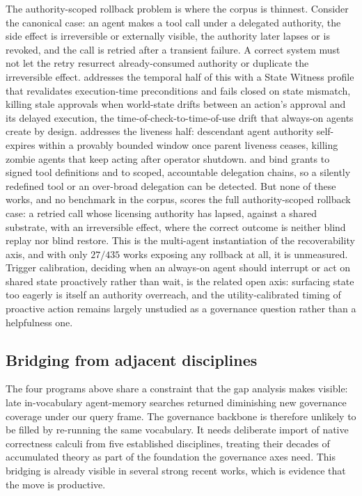 The authority-scoped rollback problem is where the corpus is thinnest. Consider the
canonical case: an agent makes a tool call under
a delegated authority, the side effect is irreversible or externally visible, the
authority later lapses or is revoked, and the call is retried after a transient
failure. A correct system must not let the retry resurrect already-consumed authority
or duplicate the irreversible effect. \citet{zhu2026openport} addresses the temporal
half of this with a State Witness profile that revalidates execution-time
preconditions and fails closed on state mismatch, killing stale approvals when
world-state drifts between an action's approval and its delayed execution, the
time-of-check-to-time-of-use drift that always-on agents create by design.
\citet{deochake2026heartbeatcred} addresses the liveness half: descendant agent
authority self-expires within a provably bounded window once parent liveness ceases,
killing zombie agents that keep acting after operator shutdown.
\citet{bhatt2025etdi} and \citet{south2025authenticateddelegation} bind grants to
signed tool definitions and to scoped, accountable delegation chains, so a silently
redefined tool or an over-broad delegation can be detected. But none of these works,
and no benchmark in the corpus, scores the full authority-scoped rollback case: a
retried call whose licensing authority has lapsed, against a shared substrate, with
an irreversible effect, where the correct outcome is neither blind replay nor blind
restore. This is the multi-agent instantiation of the recoverability axis, and with
only $27/435$ works exposing any rollback at all, it is unmeasured. Trigger
calibration, deciding when an always-on agent should interrupt or act on shared
state proactively rather than wait, is the related open axis: surfacing state too
eagerly is itself an authority overreach, and the utility-calibrated timing of
proactive action remains largely unstudied as a governance question rather than a
helpfulness one.

\subsection{Bridging from adjacent disciplines}

The four programs above share a constraint that the gap analysis makes visible:
late in-vocabulary agent-memory searches returned diminishing new governance
coverage under our query frame. The governance backbone is therefore unlikely to be
filled by re-running the same vocabulary. It needs deliberate import of native
correctness calculi from five established disciplines, treating their decades of
accumulated theory as part of the foundation the governance axes need. This bridging
is already visible in several strong recent works, which is evidence that the move
is productive.

